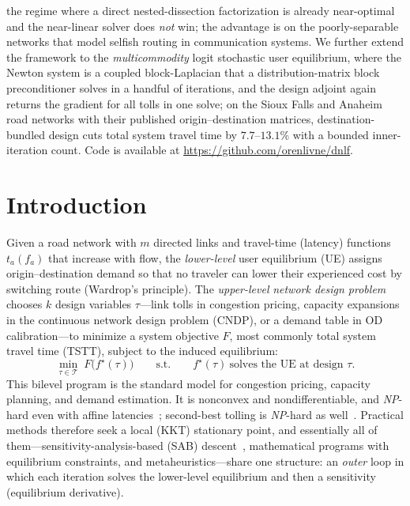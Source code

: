 \documentclass[ijoc]{informs3}
\begin{document}
{the regime where a direct nested-dissection factorization is already near-optimal and the near-linear solver does
\emph{not} win; the advantage is on the poorly-separable networks that model selfish routing in communication
systems. We further extend the framework to the \emph{multicommodity} logit stochastic
user equilibrium, where the Newton system is a coupled block-Laplacian that a distribution-matrix block
preconditioner solves in a handful of iterations, and the design adjoint again returns the gradient for all
tolls in one solve; on the Sioux Falls and Anaheim road networks with their published origin--destination
matrices, destination-bundled design cuts total system travel time by $7.7$--$13.1\%$ with a bounded
inner-iteration count. Code is available at \url{https://github.com/orenlivne/dnlf}.
}


\maketitle

\section{Introduction}\label{sec:intro}
Given a road network with $m$ directed links and travel-time (latency) functions $t_a(f_a)$ that increase with
flow, the \emph{lower-level} user equilibrium (UE) assigns origin--destination demand so that no traveler can
lower their experienced cost by switching route (Wardrop's principle). The \emph{upper-level} \emph{network
design problem} chooses $k$ design variables $\tau$---link tolls in congestion pricing, capacity expansions in
the continuous network design problem (CNDP), or a demand table in OD calibration---to minimize a system
objective $F$, most commonly total system travel time (TSTT), subject to the induced equilibrium:
\begin{equation}\label{eq:bilevel}
\min_{\tau\in\mathcal{T}}\; F\big(f^\star(\tau)\big)
\qquad\text{s.t.}\qquad f^\star(\tau)\ \text{solves the UE at design }\tau .
\end{equation}
This bilevel program is the standard model for congestion pricing, capacity planning, and demand estimation.
It is nonconvex and nondifferentiable, and \emph{NP}-hard even with affine latencies~\citep{gairing2017}; second-best
tolling is \emph{NP}-hard as well~\citep{hoefer2008}. Practical methods therefore seek a local (KKT) stationary
point, and essentially all of them---sensitivity-analysis-based (SAB) descent~\citep{tobinfriesz1988,jp2007,chiou2005},
mathematical programs with equilibrium constraints, and metaheuristics---share one structure: an \emph{outer}
loop in which each iteration solves the lower-level equilibrium and then a sensitivity (equilibrium derivative).
\end{document}
